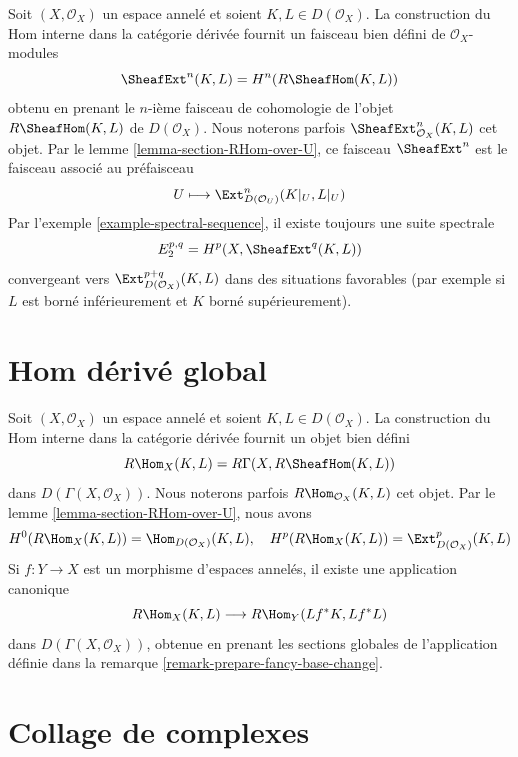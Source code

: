 \label{section-ext}

\noindent

Soit $(X, \mathcal{O}_X)$ un espace annelé et soient $K, L \in D(\mathcal{O}_X)$. La construction du Hom interne dans la catégorie dérivée fournit un faisceau bien défini de $\mathcal{O}_X$-modules
$$
\SheafExt^n(K, L) = H^n(R\SheafHom(K, L))
$$
obtenu en prenant le $n$-ième faisceau de cohomologie de l'objet $R\SheafHom(K, L)$
de $D(\mathcal{O}_X)$. Nous noterons parfois
$\SheafExt^n_{\mathcal{O}_X}(K, L)$ cet objet. Par le lemme \ref{lemma-section-RHom-over-U},
ce faisceau $\SheafExt^n$ est le faisceau associé au préfaisceau
$$
U \longmapsto \Ext^n_{D(\mathcal{O}_U)}(K|_U, L|_U)
$$
Par l'exemple \ref{example-spectral-sequence}, il existe toujours une suite spectrale
$$
E_2^{p, q} = H^p(X, \SheafExt^q(K, L))
$$
convergeant vers $\Ext^{p + q}_{D(\mathcal{O}_X)}(K, L)$
dans des situations favorables (par exemple si $L$ est borné inférieurement et
$K$ borné supérieurement).





\section{Hom dérivé global}

\label{section-global-RHom}

\noindent

Soit $(X, \mathcal{O}_X)$ un espace annelé et soient $K, L \in D(\mathcal{O}_X)$. La construction du Hom interne dans la catégorie dérivée fournit un objet bien défini
$$
R\Hom_X(K, L) = R\Gamma(X, R\SheafHom(K, L))
$$
dans $D(\Gamma(X, \mathcal{O}_X))$. Nous noterons parfois
$R\Hom_{\mathcal{O}_X}(K, L)$ cet objet. Par le lemme \ref{lemma-section-RHom-over-U},
nous avons
$$
H^0(R\Hom_X(K, L)) = \Hom_{D(\mathcal{O}_X)}(K, L),
\quad
H^p(R\Hom_X(K, L)) = \Ext_{D(\mathcal{O}_X)}^p(K, L)
$$
Si $f : Y \to X$ est un morphisme d'espaces annelés, il existe une application canonique
$$
R\Hom_X(K, L) \longrightarrow R\Hom_Y(Lf^*K, Lf^*L)
$$
dans $D(\Gamma(X, \mathcal{O}_X))$, obtenue en prenant les sections globales de l'application définie dans la remarque \ref{remark-prepare-fancy-base-change}.







\section{Collage de complexes}

